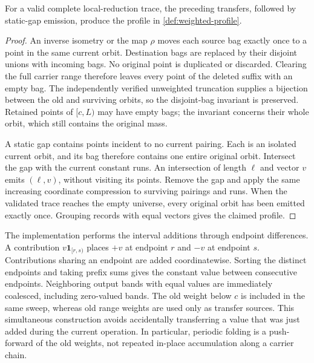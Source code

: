 \begin{proposition}
\label{prop:weighted-correctness}
For a valid complete local-reduction trace, the preceding transfers, followed
by static-gap emission, produce the profile in
\cref{def:weighted-profile}.
\end{proposition}

\begin{proof}
An inverse isometry or the map $\rho$ moves each source bag exactly once to
a point in the same current orbit.  Destination bags are replaced by their
disjoint unions with incoming bags.  No original point is duplicated or
discarded.  Clearing the full carrier range therefore leaves every point of
the deleted suffix with an empty bag.  The independently verified unweighted
truncation supplies a bijection between the old and surviving orbits, so the
disjoint-bag invariant is preserved.  Retained points of $[c,L)$ may have empty
bags; the invariant concerns their whole orbit, which still contains the
original mass.

A static gap contains points incident to no current pairing.  Each is an
isolated current orbit, and its bag therefore contains one entire original
orbit.  Intersect the gap with the current constant runs.  An intersection of
length $\ell$ and vector $v$ emits $(\ell,v)$, without visiting its points.
Remove the gap and apply the same increasing coordinate compression to
surviving pairings and runs.  When the validated trace reaches the empty
universe, every original orbit has been emitted exactly once.  Grouping
records with equal vectors gives the claimed profile.
\end{proof}

The implementation performs the interval additions through endpoint
differences.  A contribution $v\mathbf1_{[r,s)}$ places $+v$ at endpoint $r$
and $-v$ at endpoint $s$.  Contributions sharing an endpoint are added
coordinatewise.  Sorting the distinct endpoints and taking prefix sums gives
the constant value between consecutive endpoints.  Neighboring output bands
with equal values are immediately coalesced, including zero-valued bands.
The old weight below $c$ is included in the same sweep, whereas old range
weights are used only as transfer sources.  This simultaneous construction
avoids accidentally transferring a value that was just added during the
current operation.  In particular, periodic folding is a push-forward of
the old weights, not repeated in-place accumulation along a carrier chain.

